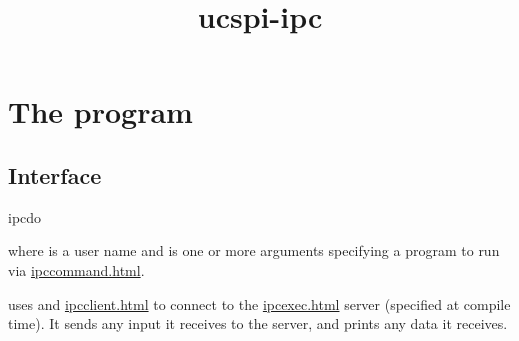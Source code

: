 \documentclass{book}
\title{ucspi-ipc}
\begin{document}
\section{The  program}

\subsection{Interface}
\begin{code}%
  ipcdo  
\end{code}
where  is a user name and  is one or more arguments
specifying a program to run via \href{\cmd{ipccommand}}{ipccommand.html}.

 uses  and \href{\cmd{ipcclient}}{ipcclient.html} to
connect to the \href{\cmd{ipcexec}}{ipcexec.html} server (specified at compile
time).  It sends any input it receives to the  server, and prints
any data it receives.
\end{document}
